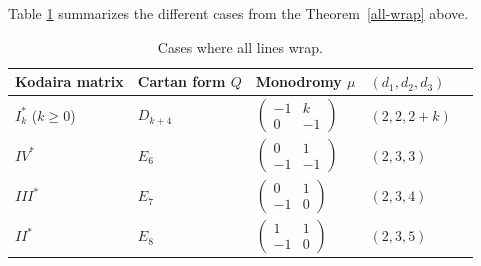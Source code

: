 \documentclass[11pt]{article}
\numberwithin{equation}{section}
\numberwithin{figure}{section}
\numberwithin{table}{section}
\theoremstyle{definition}
\begin{document}
Table \ref{wraptable} summarizes the different cases from the Theorem~\ref{all-wrap} above.

\begin{table}[h] \centering
 \begin{tabular}{ | l | l | l | l | l |}
 \hline
 Kodaira matrix & Cartan form $Q$ & Monodromy $\mu$ & $(d_1,d_2,d_3)$ \\ \hline
 $I^*_{k}$ ($k\geq 0$) & $D_{k+4}$ & 	 $\left(\begin{matrix}
		-1 &k \\
	 0 &-1
		\end{matrix}\right)$				& $(2,2,2+k)$ 	 \\ \hline
 $IV^*$ & $E_6$ & 		$\left(\begin{matrix}
		0 &1 \\
	 -1 &-1
		\end{matrix}\right)$		 & $(2,3,3)$	 \\ \hline
 $III^*$ &$E_7$ &	$\left(\begin{matrix}
		0 &1 \\
	 -1 &0
		\end{matrix}\right)$	 	 & $(2,3,4)$	 \\ \hline
 $II^*$ &$E_8$ & 	$\left(\begin{matrix}
		1 &1 \\
	 -1 &0
		\end{matrix}\right)$				& $(2,3,5)$		 \\ \hline
 \end{tabular}\caption{Cases where all lines wrap.}\label{wraptable}
 \end{table}
\end{document}
